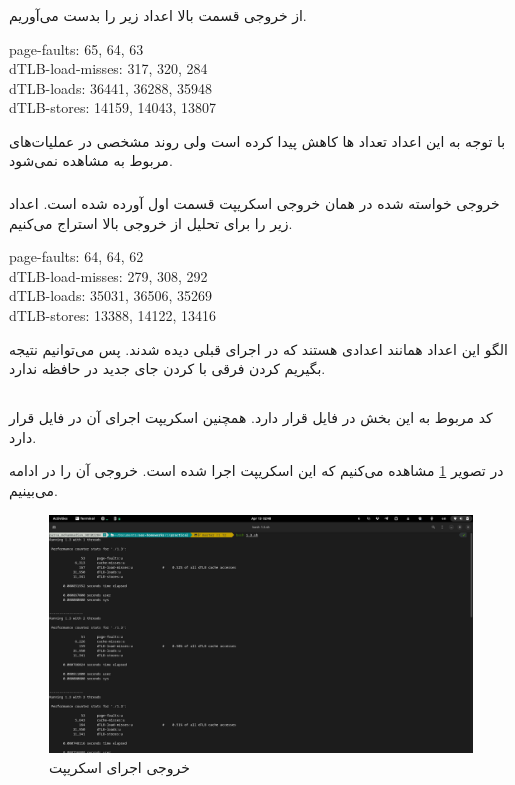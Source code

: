\documentclass{article}
\begin{document}
\subsubsection{}
از خروجی قسمت بالا اعداد زیر را بدست می‌آوریم.
\begin{latin}
page-faults: 65, 64, 63 \\
dTLB-load-misses: 317, 320, 284 \\
dTLB-loads: 36441, 36288, 35948 \\
dTLB-stores: 14159, 14043, 13807
\end{latin}
با توجه به این اعداد تعداد 
ها
کاهش پیدا کرده است ولی روند مشخصی در عملیات‌های مربوط به 
مشاهده نمی‌شود. 

\subsubsection{}
خروجی خواسته شده در همان خروجی اسکریپت قسمت اول آورده شده است. اعداد زیر را برای 
تحلیل از خروجی بالا استراج می‌کنیم. 
\begin{latin}
page-faults: 64, 64, 62 \\
dTLB-load-misses: 279, 308, 292 \\
dTLB-loads: 35031, 36506, 35269 \\
dTLB-stores: 13388, 14122, 13416
\end{latin}
الگو این اعداد همانند اعدادی هستند که در اجرای قبلی دیده شدند. پس می‌توانیم نتیجه بگیریم 
کردن فرقی با 
کردن جای جدید در حافظه ندارد. 

\subsection{}
\subsubsection{}
کد مربوط به این بخش در فایل 
قرار دارد. همچنین اسکریپت اجرای آن در فایل 
قرار دارد.

در تصویر 
\ref{fig:1.3}
مشاهده می‌کنیم که این اسکریپت اجرا شده است. 
خروجی آن را در ادامه می‌بینیم. 

\begin{figure}[H]
\centering
\includegraphics[width=\textwidth]{1.3.png}
\caption{خروجی اجرای اسکریپت}
\label{fig:1.3}
\end{figure}
\end{document}
